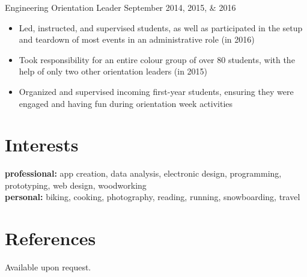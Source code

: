 \documentclass[hidelinks]{kkurucz-cv}
\begin{document}
\begin{entrylist}
{}
{\null}
\entry
{\vspace{-9mm}\null}
{Engineering Orientation Leader}
{September 2014, 2015, \& 2016}
{
\vspace{-3mm}
\begin{itemize}
	\item Led, instructed, and supervised students, as well as participated in the setup and teardown of most events in an administrative role (in 2016)
	\item Took responsibility for an entire colour group of over 80 students, with the help of only two other orientation leaders (in 2015)
	\item Organized and supervised incoming first-year students, ensuring they were engaged and having fun during orientation week activities
	\end{itemize}
}
{\null}
\end{entrylist}


\section{Interests}

\textbf{professional:} app creation, data analysis, electronic design, programming, prototyping, web design, woodworking
\\
\textbf{personal:}  biking, cooking, photography, reading, running, snowboarding, travel
\vspace{2mm}

\section{References}

{Available upon request.}
\end{document}
